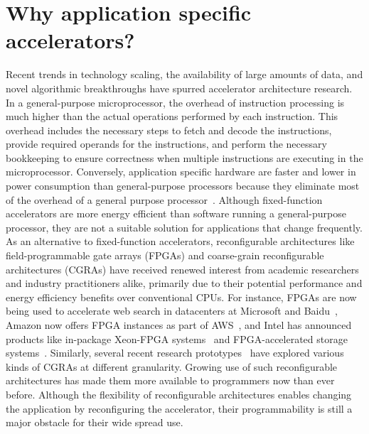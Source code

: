 
%

\section{Why application specific accelerators?}
\label{background:accel}


Recent trends in technology scaling, the availability of large amounts of data, and novel algorithmic breakthroughs have spurred accelerator architecture research.
In a general-purpose microprocessor, the overhead of instruction processing is much higher than the actual operations performed by each instruction.
This overhead includes the necessary steps to fetch and decode the instructions, provide required operands for the instructions, and perform the necessary bookkeeping to ensure correctness when multiple instructions are executing in the microprocessor.
Conversely, application specific hardware are faster and lower in power consumption than general-purpose processors because they eliminate most of the overhead of a general purpose processor~\cite{chung_micro_2010, hameed_asplos_2010_understanding}.
Although fixed-function accelerators are more energy efficient than software running a general-purpose processor, they are not a suitable solution for applications that change frequently.
As an alternative to fixed-function accelerators, reconfigurable architectures like field-programmable gate arrays (FPGAs) and coarse-grain reconfigurable architectures (CGRAs) have received renewed interest from academic researchers and industry practitioners alike, primarily due to their potential performance and energy efficiency benefits over conventional CPUs.
For instance, FPGAs are now being used to accelerate web search in datacenters at Microsoft and Baidu~\cite{catapult, baidu}, Amazon now offers FPGA instances as part of AWS~\cite{awsf1}, and Intel has announced products like in-package Xeon-FPGA systems~\cite{harp} and FPGA-accelerated storage systems~\cite{nand_flash}. Similarly, several recent research prototypes~\cite{dyser, triggered_instruction, scaledeep, scnn, plasticine, cgra_me} have explored various kinds of CGRAs at different granularity. Growing use of such reconfigurable architectures has made them more available to programmers now than ever before.
Although the flexibility of reconfigurable architectures enables changing the application by reconfiguring the accelerator, their programmability is still a major obstacle for their wide spread use.

